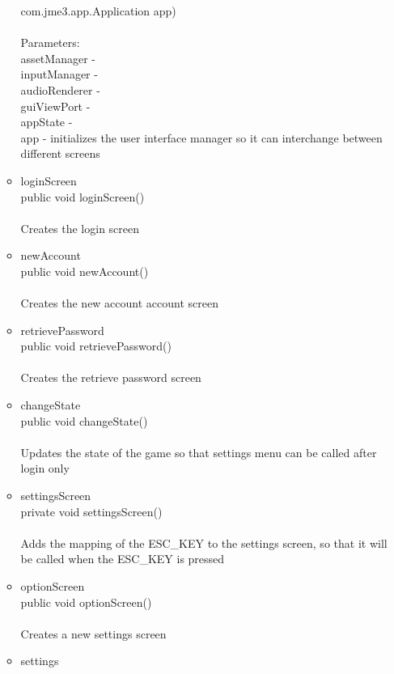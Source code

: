 \documentclass[letterpaper]{article}
\begin{document}
\begin{itemize}
\begin{itemize}
				        com.jme3.app.Application app) \\ \\
													Parameters: \\
													assetManager - \\
													inputManager - \\
													audioRenderer - \\
													guiViewPort - \\
													appState - \\
													app - initializes the user interface manager so it can interchange between different screens
											\item	loginScreen \\
													public void loginScreen() \\ \\
													Creates the login screen	
											\item	newAccount \\
													public void newAccount() \\ \\
													Creates the new account account screen
											\item	retrievePassword \\
													public void retrievePassword() \\ \\
													Creates the retrieve password screen
											\item	changeState \\
													public void changeState() \\ \\
													Updates the state of the game so that settings menu can be called after login only
											\item	settingsScreen \\
													private void settingsScreen() \\ \\
													Adds the mapping of the ESC\_KEY to the settings screen, so that it will be called when the ESC\_KEY is pressed
											\item	optionScreen \\
													public void optionScreen() \\ \\
													Creates a new settings screen
											\item	settings \\

\end{itemize}
\end{itemize}
\end{document}
